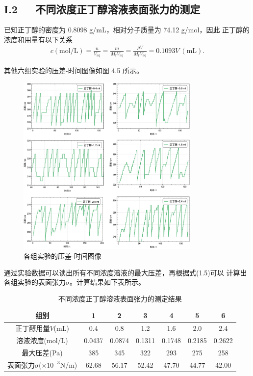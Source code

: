 \documentclass[12pt]{ctexart}
\numberwithin{equation}{section}
\begin{document}
\subsection*{I.2~~~不同浓度正丁醇溶液表面张力的测定}

已知正丁醇的密度为 0.8098 g/mL，相对分子质量为 74.12 g/mol，因此
正丁醇的浓度和用量有以下关系
\begin{align}
    c(\mathrm{mol/L}) = \frac{n}{V_{\text{aq}}}
    = \frac{m}{M_{\text{r}}V_{\text{aq}}}
    = \frac{\rho V}{M_{\text{r}}V_{\text{aq}}}
    = 0.1093 V~(\mathrm{mL}).
    \tag{I.2}
\end{align}

其他六组实验的压差-时间图像如图 4.5 所示。

\begin{figure}[ht]
    \centering
    \includegraphics[width=0.8\textwidth]{plot_all.jpeg}
    \caption{各组实验的压差-时间图像}
\end{figure}

通过实验数据可以读出所有不同浓度溶液的最大压差，再根据式(1.5)可以
计算出各组实验的表面张力$\sigma$。计算结果如下表所示。

\begin{longtable}{c|cccccc}
    \caption{不同浓度正丁醇溶液表面张力的测定结果} \\
    \hline
    组别 & 1 & 2 & 3 & 4 & 5 & 6 \\
    \hline
    正丁醇用量$V$(mL) & 0.4 & 0.8 & 1.2 & 1.6 & 2.0 & 2.4  \\
    \hline
    溶液浓度(mol/L) & 0.0437 & 0.0874 & 0.1311 & 0.1748 & 0.2185 & 0.2622  \\
    \hline
    最大压差(Pa) & 385 & 345 & 322 & 293 & 275 & 258  \\
    \hline
    表面张力$\sigma$($\times 10^{-3}$N/m) &
    62.68 & 56.17 & 52.42 & 47.70 & 44.77 & 42.00  \\
    \hline
\end{longtable}
\end{document}
